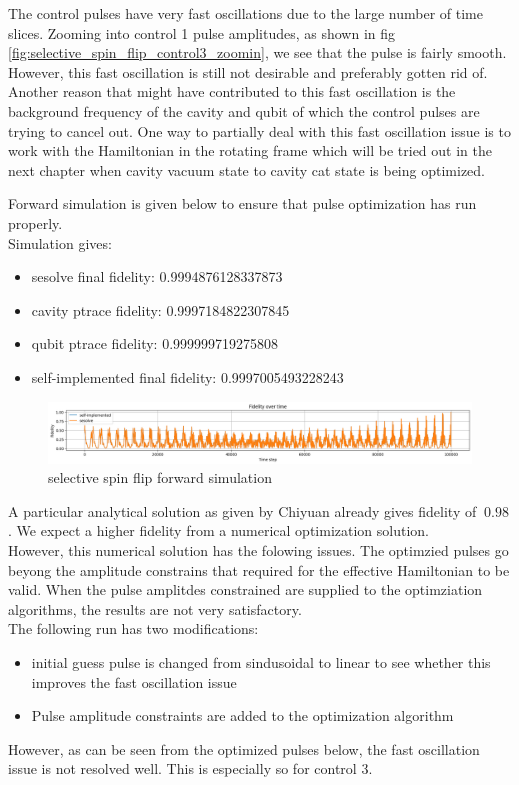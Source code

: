 \documentclass[12pt]{report}
\begin{document}
The control pulses have very fast oscillations due to the large number of time slices.
Zooming into control 1 pulse amplitudes, as shown in fig \ref{fig:selective_spin_flip_control3_zoomin},
we see that the pulse is fairly smooth. However, this fast oscillation is still not desirable and preferably gotten rid of. 
Another reason that might have contributed to this fast oscillation is the background frequency of the cavity and qubit 
of which the control pulses are trying to cancel out. One way to partially deal with this fast oscillation issue is to work
with the Hamiltonian in the rotating frame which will be tried out in the next chapter when cavity vacuum state to cavity cat state
is being optimized.  

Forward simulation is given below to ensure that pulse optimization has run properly. 
\\
Simulation gives: 
\begin{itemize}
    \item sesolve final fidelity:  0.9994876128337873
    \item cavity ptrace fidelity:  0.9997184822307845
    \item qubit ptrace fidelity:  0.999999719275808
    \item self-implemented final fidelity:  0.9997005493228243
\end{itemize}
\begin{figure}[H]
    \centering
    \includegraphics[width=0.95\linewidth]{selective_spin_flip_GRAPE_simulation.png}
    \caption{selective spin flip forward simulation}
    \label{fig:selective_spin_flip_forward_simulation}
\end{figure}


A particular analytical solution as given by Chiyuan already gives fidelity of $~0.98$.
            We expect a higher fidelity from a numerical optimization solution. 
\\
However, this numerical solution has the folowing issues.
The optimzied pulses go beyong the amplitude constrains that required for the effective Hamiltonian to be valid. 
When the pulse amplitdes constrained are supplied to the optimziation algorithms, the results are not very satisfactory. 
\\
The following run has two modifications: 
\begin{itemize}
    \item initial guess pulse is changed from sindusoidal to linear to see whether this improves the fast oscillation issue
    \item Pulse amplitude constraints are added to the optimization algorithm
\end{itemize}
However, as can be seen from the optimized pulses below, the fast oscillation issue is not resolved well. 
This is especially so for control 3.
\\
\end{document}
